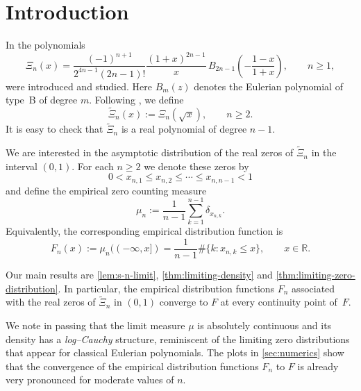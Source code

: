 \documentclass[12pt,twoside]{article}
\begin{document}
\vspace{0.5cm}

\section*{Introduction}
In \cite{TallaWaffo2026arxiv2602.16761} the polynomials
\begin{equation}\label{eq:Xi-def}
  \Xi_n(x)
  = \frac{(-1)^{n+1}}{2^{4n-1}(2n-1)!}
    \frac{(1+x)^{2n-1}}{x}\,
    B_{2n-1}\!\left(-\frac{1-x}{1+x}\right),
  \qquad n\ge 1,
\end{equation}
were introduced and studied. Here $B_m(z)$ denotes the Eulerian polynomial of type~B of degree $m$.
Following \cite{TallaWaffo2026arxiv2602.16761}, we define
\begin{equation}\label{eq:Xitilde-def}
  \widetilde{\Xi}_n(x) := \Xi_n(\sqrt{x}), \qquad n\ge 2.
\end{equation}
It is easy to check that $\widetilde{\Xi}_n$ is a real polynomial of degree $n-1$\cite{TallaWaffo2026arxiv2602.16761}.

We are interested in the asymptotic distribution of the real zeros of $\widetilde{\Xi}_n$ in the interval $(0,1)$.
For each $n\ge2$ we denote these zeros by
\[
  0 < x_{n,1} \le x_{n,2} \le \cdots \le x_{n,n-1} < 1
\]
and define the empirical zero counting measure
\begin{equation}\label{eq:mu-n-def}
  \mu_n := \frac1{n-1}\sum_{k=1}^{n-1} \delta_{x_{n,k}}.
\end{equation}
Equivalently, the corresponding empirical distribution function is
\[
  F_n(x) := \mu_n((-\infty,x]) 
   = \frac1{n-1}\#\{k: x_{n,k}\le x\}, \qquad x\in\mathbb{R}.
\]

Our main results are \cref{lem:s-n-limit}, \cref{thm:limiting-density} and \cref{thm:limiting-zero-distribution}. In particular, the empirical distribution functions $F_n$ associated with the real zeros of $\widetilde{\Xi}_n$ in $(0,1)$ converge to $F$ at every continuity point of~$F$.

\vspace{0.2cm}

We note in passing that the limit measure $\mu$ is absolutely continuous and its density has a \emph{log--Cauchy} structure, reminiscent of the limiting zero distributions that appear for classical Eulerian polynomials.
The plots in \cref{sec:numerics} show that the convergence of the empirical distribution functions $F_n$ to $F$ is already very pronounced for moderate values of $n$. 
\end{document}
